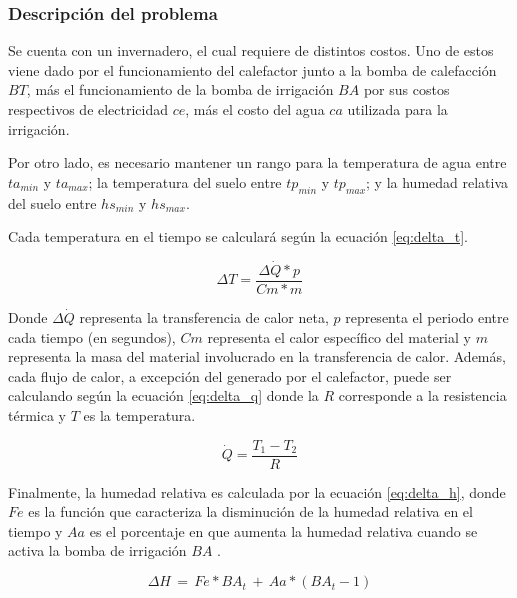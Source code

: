 \documentclass[letterpaper,conference]{IEEEtran}
\begin{document}
		
	\subsubsection{Descripción del problema}
			
	Se cuenta con un invernadero, el cual requiere de distintos costos. Uno de estos viene dado por el funcionamiento del calefactor junto a la bomba de calefacción $BT$, más el funcionamiento de la bomba de irrigación $BA$ por sus costos respectivos de electricidad $ce$, más el costo del agua $ca$ utilizada para la irrigación.
	
	Por otro lado, es necesario mantener un rango para la temperatura de agua entre $ta_{min}$ y $ta_{max}$; la temperatura del suelo entre $tp_{min}$ y  $tp_{max}$; y la humedad relativa del suelo entre $hs_{min}$ y $hs_{max}$.
				

				Cada temperatura en el tiempo se calculará según la ecuación \ref{eq:delta_t}.
				
				
				
				\begin{equation} 
				\Delta T = \frac{\Delta \dot{Q} * p}{Cm * m}
				\label{eq:delta_t}
				\end{equation}
				
	Donde $\Delta \dot{Q}$ representa la transferencia de calor neta, $p$ representa el periodo entre cada tiempo (en segundos), $Cm$ representa el calor específico del material y $m$ representa la masa del material involucrado en la transferencia de calor. Además, cada flujo de calor, a excepción del generado por el calefactor, puede ser calculando según la ecuación \ref{eq:delta_q} donde la $R$ corresponde a la resistencia térmica y $T$ es la temperatura.
				
				
				
				\begin{equation}
				 \dot{Q} = \frac{T_{1}-T_{2}}{R}
				\label{eq:delta_q}
				\end{equation}
				
				
				
				Finalmente, la humedad relativa es calculada por la ecuación \ref{eq:delta_h}, donde $Fe$ es la función que caracteriza la disminución de la humedad relativa en el tiempo y $Aa$ es el porcentaje en que aumenta la humedad relativa cuando se activa la bomba de irrigación $BA$	.
				
				\begin{equation}
				\Delta H \, = \, Fe*BA_{t}\,+\, Aa*(BA_{t}-1)
				\label{eq:delta_h}
				\end{equation}
\end{document}
